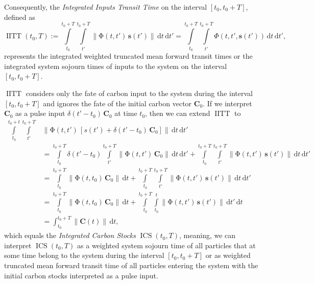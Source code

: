 \documentclass[9pt,twoside]{pnas-new}
\newcommand{\IITT}{\operatorname{IITT}}
\newcommand{\ICS}{\operatorname{ICS}}
\newcommand{\intl}{\int\limits}
\newcommand{\dd}[1]{\,\mathrm{d}#1}
\renewcommand{\vec}[1]{\mathbf{#1}}
\newcommand{\tens}[1]{\mathrm{#1}}
\newcommand{\itPhi}{\mathit{\Phi}}
\newcommand{\vnorm}[1]{\left\|#1\right\|}
\begin{document}
Consequently, the \emph{Integrated Inputs Transit Time} on the interval $[t_0, t_0+T]$, defined as
\begin{equation}
    \label{eqn:IITT}
    \IITT(t_0, T) := \intl_{t_0}^{t_0+T} \intl_{t'}^{t_0+T} \vnorm{\tens{\Phi}(t,t')\,\vec{s}(t')}\dd{t}\dd{t'} = \intl_{t_0}^{t_0+T} \intl_{t'}^{t_0+T} \itPhi(t,t',\vec{s}(t'))\dd{t}\dd{t'},
\end{equation}
represents the integrated weighted truncated mean forward transit times or the integrated system sojourn times of inputs to the system on the interval $[t_0, t_0+T]$.

$\IITT$ considers only the fate of carbon input to the system during the interval $[t_0,t_0+T]$ and ignores the fate of the initial carbon vector $\vec{C}_0$.
If we interpret $\vec{C}_0$ as a pulse input $\delta(t'-t_0)\,\vec{C}_0$ at time $t_0$, then we can extend $\IITT$ to
\begin{equation}
    \label{eqn:ICS}
    \begin{aligned}
        \intl_{t_0}^{t_0+t} \intl_{t'}^{t_0+T} &\vnorm{\tens{\Phi}(t,t')\,\left[s(t') + \delta(t'-t_0)\,\vec{C}_0\right]}\dd{t}\dd{t'} \\
        &=\intl_{t_0}^{t_0+T} \delta(t'-t_0) \intl_{t'}^{t_0+T}\vnorm{\tens{\Phi}(t,t')\,\vec{C}_0}\dd{t}\dd{t'} + \intl_{t_0}^{t_0+T}\intl_{t'}^{t_0+T}\vnorm{\tens{\Phi}(t,t')\,\vec{s}(t')}\dd{t}\dd{t'}\\
        &= \intl_{t_0}^{t_0+T}\vnorm{\tens{\Phi}(t,t_0)\,\vec{C}_0}\dd{t} +\intl_{t_0}^{t_0+T}\intl_{t'}^{t_0+T}\vnorm{\tens{\Phi}(t,t')\,\vec{s}(t')}\dd{t}\dd{t'}\\
        & = \intl_{t_0}^{t_0+T}\vnorm{\tens{\Phi}(t,t_0)\,\vec{C}_0}\dd{t} + \intl_{t_0}^{t_0+T} \intl_{t_0}^t \vnorm{\tens{\Phi}(t,t')\,\vec{s}(t')}\dd{t'}\dd{t}\\
        &= \int_{t_0}^{t_0+T} \vnorm{\vec{C}(t)}\dd{t},
    \end{aligned}
\end{equation}
which equals the \emph{Integrated Carbon Stocks} $\ICS(t_0,T)$, meaning, we can interpret $\ICS(t_0, T)$ as a weighted system sojourn time of all particles that at some time belong to the system during the interval $[t_0,t_0+T]$ or as weighted truncated mean forward transit time of all particles entering the system with the initial carbon stocks interpreted as a pulse input.
\end{document}
